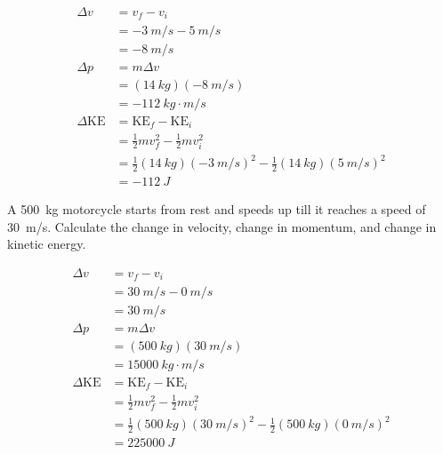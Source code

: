 \documentclass[]{exam}
\begin{document}
\begin{questions}
\begin{solution}
\begin{align*}
    \Delta v &= v_f - v_i \\[1ex]
    &= \SI{-3}{m/s} - \SI{5}{m/s} \\[1ex]
    &= \boxed{\SI{-8}{m/s}} \\[2ex]
    \Delta p &= m \Delta v \\[1ex]
    &= (\SI{14}{kg})(\SI{-8}{m/s}) \\[1ex]
    &= \boxed{\SI{-112}{kg\cdot m/s}} \\[2ex]
    \Delta \mathrm{KE} &= \mathrm{KE}_f - \mathrm{KE}_i \\[1ex]
    &= \frac{1}{2}m v_f^2 - \frac{1}{2}mv_i^2 \\[1ex]
    &= \frac{1}{2}(\SI{14}{kg})(\SI{-3}{m/s})^2 - \frac{1}{2}(\SI{14}{kg}) (\SI{5}{m/s})^2 \\[1ex]
    &= \boxed{\SI{-112}{J}}
\end{align*}
\end{solution}

\ifprintanswers
    \clearpage
\fi

\question
A \SI{500}{kg} motorcycle starts from rest and speeds up till it reaches a speed of \SI{30}{m/s}. Calculate the change in velocity, change in momentum, and change in kinetic energy.

\begin{solution}
\begin{align*}
    \Delta v &= v_f - v_i \\[1ex]
    &= \SI{30}{m/s} - \SI{0}{m/s} \\[1ex]
    &= \boxed{\SI{30}{m/s}} \\[2ex]
    \Delta p &= m \Delta v \\[1ex]
    &= (\SI{500}{kg})(\SI{30}{m/s}) \\[1ex]
    &= \boxed{\SI{15000}{kg\cdot m/s}} \\[2ex]
    \Delta \mathrm{KE} &= \mathrm{KE}_f - \mathrm{KE}_i \\[1ex]
    &= \frac{1}{2}m v_f^2 - \frac{1}{2}mv_i^2 \\[1ex]
    &= \frac{1}{2}(\SI{500}{kg})(\SI{30}{m/s})^2 - \frac{1}{2}(\SI{500}{kg}) (\SI{0}{m/s})^2 \\[1ex]
    &= \boxed{\SI{225000}{J}}
\end{align*}
\end{solution}


\ifprintanswers
    \clearpage
\fi


\end{questions}
\end{document}
